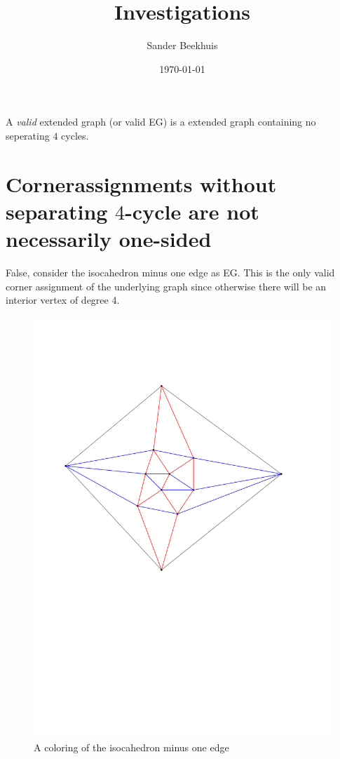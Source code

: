 




\title{Investigations}
\author{Sander Beekhuis}
\date{\today} %



\maketitle



A \emph{valid} extended graph (or valid EG) is a extended graph containing no seperating $4$ cycles.



\section{Cornerassignments without separating $4$-cycle are not necessarily one-sided}
  False, consider the isocahedron minus one edge as EG. This is the only valid corner assignment of the underlying graph since otherwise there will be an interior vertex of degree 4.
  \begin{figure}[h]
    \centering
    \includegraphics[scale=.5]{img/isoc_m1_colored}
    \caption{A coloring of the isocahedron minus one edge}
    \label{fig:}
  \end{figure}


